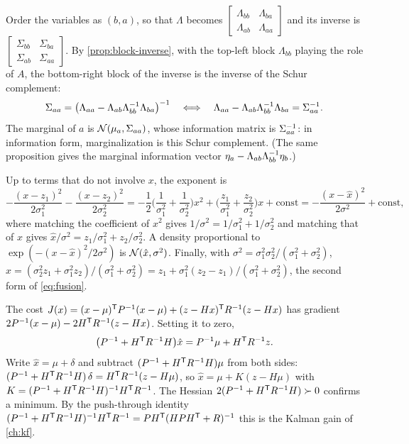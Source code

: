 \begin{solutions}
  \item Order the variables as $(b, a)$, so that $\Lambda$ becomes $\begin{bmatrix}\Lambda_{bb} & \Lambda_{ba}\\ \Lambda_{ab} & \Lambda_{aa}\end{bmatrix}$ and its inverse is
        $\begin{bmatrix}\Sigma_{bb} & \Sigma_{ba}\\ \Sigma_{ab} & \Sigma_{aa}\end{bmatrix}$. By \cref{prop:block-inverse}, with the top-left block $\Lambda_{bb}$ playing the
        role of $A$, the bottom-right block of the inverse is the inverse of the Schur complement:
        \[
          \Sigma_{aa} = \big(\Lambda_{aa} - \Lambda_{ab}\Lambda_{bb}^{-1}\Lambda_{ba}\big)^{-1}
          \quad\Longleftrightarrow\quad \Lambda_{aa} - \Lambda_{ab}\Lambda_{bb}^{-1}\Lambda_{ba} = \Sigma_{aa}^{-1} .
        \]
        The marginal of $a$ is $\mathcal{N}(\mu_a, \Sigma_{aa})$, whose information matrix is $\Sigma_{aa}^{-1}$: in information form, marginalization is this Schur
        complement. (The same proposition gives the marginal information vector $\eta_a - \Lambda_{ab}\Lambda_{bb}^{-1}\eta_b$.)

  \item Up to terms that do not involve $x$, the exponent is
        \[
          -\frac{(x - z_1)^2}{2\sigma_1^2} - \frac{(x - z_2)^2}{2\sigma_2^2}
          = -\frac12\Big(\frac{1}{\sigma_1^2} + \frac{1}{\sigma_2^2}\Big)x^2 + \Big(\frac{z_1}{\sigma_1^2} + \frac{z_2}{\sigma_2^2}\Big)x + \text{const}
          = -\frac{(x - \hat x)^2}{2\sigma^2} + \text{const},
        \]
        where matching the coefficient of $x^2$ gives $1/\sigma^2 = 1/\sigma_1^2 + 1/\sigma_2^2$ and matching that of $x$ gives
        $\hat x/\sigma^2 = z_1/\sigma_1^2 + z_2/\sigma_2^2$. A density proportional to $\exp(-(x - \hat x)^2/2\sigma^2)$ is $\mathcal{N}(\hat x, \sigma^2)$. Finally, with
        $\sigma^2 = \sigma_1^2\sigma_2^2/(\sigma_1^2 + \sigma_2^2)$,
        $\hat x = (\sigma_2^2z_1 + \sigma_1^2z_2)/(\sigma_1^2 + \sigma_2^2) = z_1 + \sigma_1^2(z_2 - z_1)/(\sigma_1^2 + \sigma_2^2)$, the second form of \eqref{eq:fusion}.

  \item The cost $J(x) = (x - \mu)^{\mathsf{T}} P^{-1}(x - \mu) + (z - Hx)^{\mathsf{T}} R^{-1}(z - Hx)$ has gradient $2P^{-1}(x - \mu) - 2H^{\mathsf{T}} R^{-1}(z - Hx)$. Setting it to zero,
        \[
          \big(P^{-1} + H^{\mathsf{T}} R^{-1} H\big)\hat x = P^{-1}\mu + H^{\mathsf{T}} R^{-1} z .
        \]
        Write $\hat x = \mu + \delta$ and subtract $(P^{-1} + H^{\mathsf{T}} R^{-1} H)\mu$ from both sides: $(P^{-1} + H^{\mathsf{T}} R^{-1} H)\,\delta = H^{\mathsf{T}} R^{-1}(z - H\mu)$, so
        $\hat x = \mu + K(z - H\mu)$ with $K = (P^{-1} + H^{\mathsf{T}} R^{-1} H)^{-1} H^{\mathsf{T}} R^{-1}$. The Hessian $2(P^{-1} + H^{\mathsf{T}} R^{-1} H) \succ 0$ confirms a minimum. By the push-through
        identity $(P^{-1} + H^{\mathsf{T}} R^{-1} H)^{-1} H^{\mathsf{T}} R^{-1} = PH^{\mathsf{T}}(HPH^{\mathsf{T}} + R)^{-1}$ this is the Kalman gain of \cref{ch:kf}.


\end{solutions}
